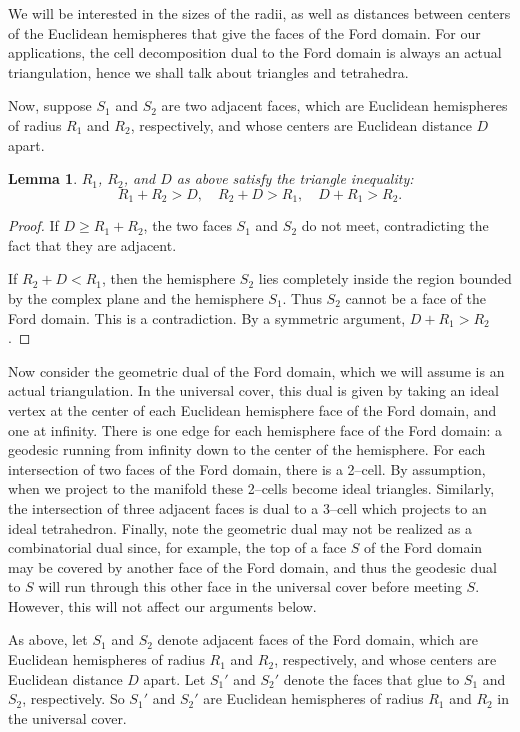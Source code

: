 \documentclass[11pt]{amsart}
\theoremstyle{plain}
\newtheorem{lemma}[theorem]{Lemma}
\theoremstyle{definition}
\begin{document}
We will be interested in the sizes of the radii, as well as distances
between centers of the Euclidean hemispheres that give the faces of
the Ford domain.  For our applications, the cell decomposition dual to
the Ford domain is always an actual triangulation, hence we shall talk
about triangles and tetrahedra.

Now, suppose $S_1$ and $S_2$ are two adjacent faces, which are
Euclidean hemispheres of radius $R_1$ and $R_2$, respectively, and
whose centers are Euclidean distance $D$ apart.

\begin{lemma}\label{lemma:triangle-ineq}
$R_1$, $R_2$, and $D$ as above satisfy the triangle inequality:
	$$R_1 + R_2 > D, \quad R_2 + D > R_1, \quad D+R_1 > R_2.$$
\end{lemma}

\begin{proof}
If $D \geq R_1+R_2$, the two faces $S_1$ and $S_2$ do not meet,
contradicting the fact that they are adjacent.

If $R_2+ D < R_1$, then the hemisphere $S_2$ lies completely inside
the region bounded by the complex plane and the hemisphere $S_1$.
Thus $S_2$ cannot be a face of the Ford domain.  This is a
contradiction.  By a symmetric argument, $D+R_1 > R_2$.
\end{proof}

Now consider the geometric dual of the Ford domain, which we will
assume is an actual triangulation.  In the universal cover, this dual
is given by taking an ideal vertex at the center of each Euclidean
hemisphere face of the Ford domain, and one at infinity.  There is one
edge for each hemisphere face of the Ford domain: a geodesic running
from infinity down to the center of the hemisphere.  For each
intersection of two faces of the Ford domain, there is a 2--cell.  By
assumption, when we project to the manifold these 2--cells become
ideal triangles.  Similarly, the intersection of three adjacent faces
is dual to a 3--cell which projects to an ideal tetrahedron.  Finally,
note the geometric dual may not be realized as a combinatorial dual
since, for example, the top of a face $S$ of the Ford domain may be
covered by another face of the Ford domain, and thus the geodesic dual
to $S$ will run through this other face in the universal cover before
meeting $S$.  However, this will not affect our arguments below.

As above, let $S_1$ and $S_2$ denote adjacent faces of the Ford
domain, which are Euclidean hemispheres of radius $R_1$ and $R_2$,
respectively, and whose centers are Euclidean distance $D$ apart.  Let
$S_1'$ and $S_2'$ denote the faces that glue to $S_1$ and $S_2$,
respectively.  So $S_1'$ and $S_2'$ are Euclidean hemispheres of
radius $R_1$ and $R_2$ in the universal cover.
\end{document}
